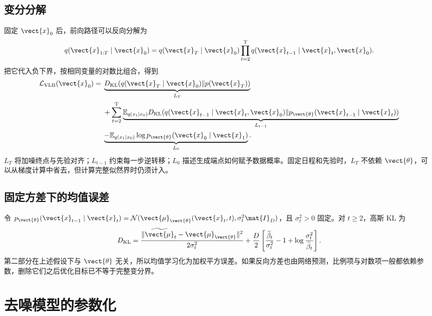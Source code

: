 \documentclass[../textbook.tex]{subfiles}
\begin{document}
\subsection{变分分解}
固定 $\vect{x}_0$ 后，前向路径可以反向分解为
\begin{equation}
 q(\vect{x}_{1:T}\mid \vect{x}_0)=q(\vect{x}_T\mid \vect{x}_0)\prod_{t=2}^{\mathrm{T}}q(\vect{x}_{t-1}\mid \vect{x}_t,\vect{x}_0).
\end{equation}
把它代入负下界，按相同变量的对数比组合，得到
\begin{align}
 \mathcal L_{\mathrm{VLB}}(\vect{x}_0)=\;&\underbrace{D_{\mathrm{KL}}(q(\vect{x}_T\mid \vect{x}_0)\|p(\vect{x}_T))}_{L_T}\\
 &+\sum_{t=2}^{\mathrm{T}}\underbrace{\mathbb E_{q(x_t\mid x_0)}D_{\mathrm{KL}}(q(\vect{x}_{t-1}\mid \vect{x}_t,\vect{x}_0)\|p_{\vect{\theta}}(\vect{x}_{t-1}\mid \vect{x}_t))}_{L_{t-1}}\\
 &\underbrace{-\mathbb E_{q(x_1\mid x_0)}\log p_{\vect{\theta}}(\vect{x}_0\mid \vect{x}_1)}_{L_0}.
 \label{eq:diff-elbo}
\end{align}
$L_T$ 将加噪终点与先验对齐；$L_{t-1}$ 约束每一步逆转移；$L_0$ 描述生成端点如何赋予数据概率。固定日程和先验时，$L_T$ 不依赖 $\vect{\theta}$，可以从梯度计算中省去，但计算完整似然界时仍须计入。

\subsection{固定方差下的均值误差}
令 $p_{\vect{\theta}}(\vect{x}_{t-1}\mid \vect{x}_t)=\mathcal N(\vect{\mu}_{\vect{\theta}}(\vect{x}_t,t),\sigma_t^2\mat{I}_D)$，且 $\sigma_t^2>0$ 固定。对 $t\ge2$，高斯 KL 为
\begin{equation}
 D_{\mathrm{KL}}=
 \frac{\|\widetilde{\vect{\mu}}_t-\vect{\mu}_{\vect{\theta}}\|^2}{2\sigma_t^2}
 +\frac D2\left[\frac{\widetilde\beta_t}{\sigma_t^2}-1+\log\frac{\sigma_t^2}{\widetilde\beta_t}\right].
\end{equation}
第二部分在上述假设下与 $\vect{\theta}$ 无关，所以均值学习化为加权平方误差。如果反向方差也由网络预测，比例项与对数项一般都依赖参数，删除它们之后优化目标已不等于完整变分界。

\section{去噪模型的参数化}
\end{document}
